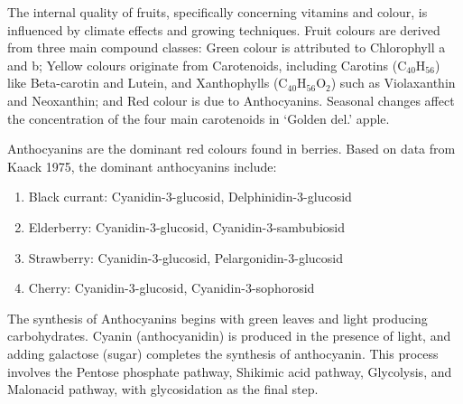 \vspace{1em}
The internal quality of fruits, specifically concerning vitamins and colour, is influenced by climate effects and growing techniques. Fruit colours are derived from three main compound classes: Green colour is attributed to Chlorophyll a and b; Yellow colours originate from Carotenoids, including Carotins (C$_40$H$_56$) like Beta-carotin and Lutein, and Xanthophylls (C$_40$H$_56$O$_2$) such as Violaxanthin and Neoxanthin; and Red colour is due to Anthocyanins. Seasonal changes affect the concentration of the four main carotenoids in ‘Golden del.’ apple.

\vspace{0.5em}
Anthocyanins are the dominant red colours found in berries. Based on data from Kaack 1975, the dominant anthocyanins include: 

\begin{enumerate} 
    \item Black currant: Cyanidin-3-glucosid, Delphinidin-3-glucosid 
    \item Elderberry: Cyanidin-3-glucosid, Cyanidin-3-sambubiosid 
    \item Strawberry: Cyanidin-3-glucosid, Pelargonidin-3-glucosid 
    \item Cherry: Cyanidin-3-glucosid, Cyanidin-3-sophorosid 
\end{enumerate} 

\vspace{0.5em}
The synthesis of Anthocyanins begins with green leaves and light producing carbohydrates. Cyanin (anthocyanidin) is produced in the presence of light, and adding galactose (sugar) completes the synthesis of anthocyanin. This process involves the Pentose phosphate pathway, Shikimic acid pathway, Glycolysis, and Malonacid pathway, with glycosidation as the final step.

